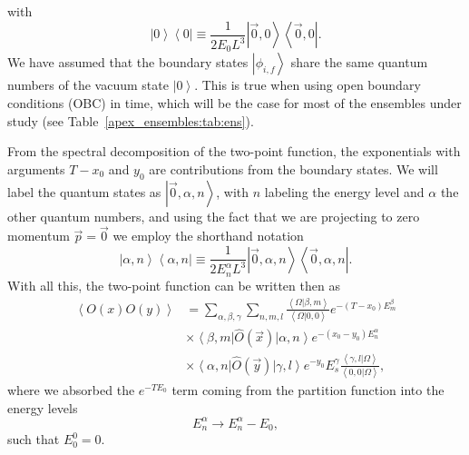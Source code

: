 with 
\begin{equation}
\left|0\right>\left<0\right|\equiv\frac{1}{2E_0L^3}\left|\vec{0},0\right>\left<\vec{0},0\right|.
\end{equation}
We have assumed that the boundary states $\left|\phi_{i,f}\right>$ share the same quantum numbers of the vacuum state $\left|0\right>$. This is true when using open boundary conditions (OBC) in time, which will be the case for most of the ensembles under study (see Table~\ref{apex_ensembles:tab:ens}).

From the spectral decomposition of the two-point function, the exponentials with arguments $T-x_0$ and $y_0$ are contributions from the boundary states. We will label the quantum states as $\left|\vec{0},\alpha,n\right>$, with $n$ labeling the energy level and $\alpha$ the other quantum numbers, and using the fact that we are projecting to zero momentum $\vec{p}=\vec{0}$ we employ the shorthand notation 
\begin{equation}
\left|\alpha,n\right>\left<\alpha,n\right|\equiv\frac{1}{2E_n^{\alpha}L^3}\left|\vec{0},\alpha,n\right>\left<\vec{0},\alpha,n\right|.
\end{equation}
With all this, the two-point function can be written then as
\begin{align}
\left<O(x)O(y)\right>&=\sum_{\alpha,\beta,\gamma}\sum_{n,m,l}\frac{\left<\Omega|\beta,m\right>}{\left<\Omega|0,0\right>}e^{-(T-x_0)E_m^{\beta}} \\
&\times\left<\beta,m\right|\hat{O}(\vec{x})\left|\alpha,n\right>e^{-(x_0-y_0)E_n^{\alpha}} \\
&\times\left<\alpha,n\right|\hat{O}(\vec{y})\left|\gamma,l\right>e^{-y_0}E_s^{\gamma}\frac{\left<\gamma,l|\Omega\right>}{\left<0,0|\Omega\right>},
\end{align}
where we absorbed the $e^{-TE_0}$ term coming from the partition function into the energy levels
\begin{equation}
E_n^{\alpha}\rightarrow E_n^{\alpha}-E_0,
\end{equation}
such that $E_0^0=0$.

